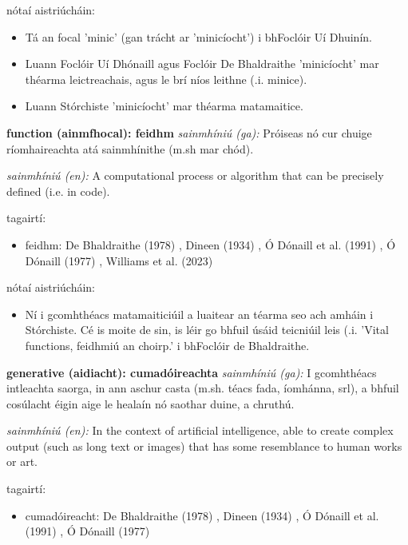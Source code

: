 \documentclass{article}
\begin{document}
nótaí aistriúcháin:
\begin{itemize}
	\item Tá an focal 'minic' (gan trácht ar 'minicíocht') i bhFoclóir Uí Dhuinín.
	\item Luann Foclóir Uí Dhónaill agus Foclóir De Bhaldraithe 'minicíocht' mar théarma leictreachais, agus le brí níos leithne (.i. minice).
	\item Luann Stórchiste 'minicíocht' mar théarma matamaitice.
\end{itemize}


\textbf{function (ainmfhocal): feidhm}
\textit{sainmhíniú (ga):} Próiseas nó cur chuige ríomhaireachta atá sainmhínithe (m.sh mar chód).

\textit{sainmhíniú (en):} A computational process or algorithm that can be precisely defined (i.e. in code).

tagairtí:
\begin{itemize}
	\item feidhm: De Bhaldraithe (1978) \cite{de-bhaldraithe}, Dineen (1934) \cite{dineen}, Ó Dónaill et al. (1991) \cite{focloir-beag}, Ó Dónaill (1977) \cite{odonaill}, Williams et al. (2023) \cite{storchiste}
\end{itemize}

nótaí aistriúcháin:
\begin{itemize}
	\item Ní i gcomhthéacs matamaiticiúil a luaitear an téarma seo ach amháin i Stórchiste. Cé is moite de sin, is léir go bhfuil úsáid teicniúil leis (.i. 'Vital functions, feidhmiú an choirp.' i bhFoclóir de Bhaldraithe.
\end{itemize}


\textbf{generative (aidiacht): cumadóireachta}
\textit{sainmhíniú (ga):} I gcomhthéacs intleachta saorga, in ann aschur casta (m.sh. téacs fada, íomhánna, srl), a bhfuil cosúlacht éigin aige le healaín nó saothar duine, a chruthú.

\textit{sainmhíniú (en):} In the context of artificial intelligence, able to create complex output (such as long text or images) that has some resemblance to human works or art.

tagairtí:
\begin{itemize}
	\item cumadóireacht: De Bhaldraithe (1978) \cite{de-bhaldraithe}, Dineen (1934) \cite{dineen}, Ó Dónaill et al. (1991) \cite{focloir-beag}, Ó Dónaill (1977) \cite{odonaill}
\end{itemize}
\end{document}

